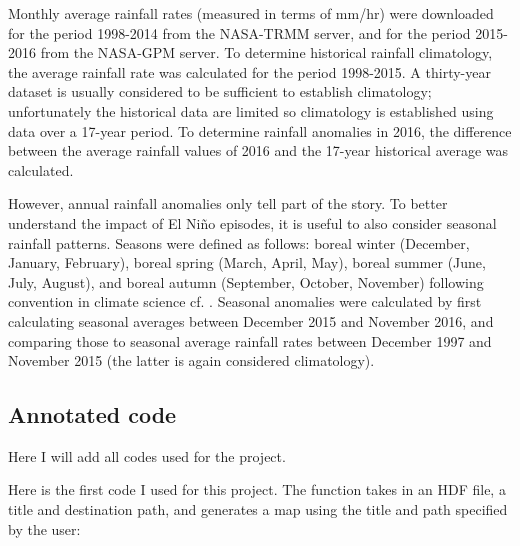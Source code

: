 \documentclass[12pt]{article}
\begin{document}
Monthly average rainfall rates (measured in terms of mm/hr) were downloaded for the period 1998-2014 from the NASA-TRMM server, and for the period 2015-2016 from the NASA-GPM server. To determine historical rainfall climatology, the average rainfall rate was calculated for the period 1998-2015. A thirty-year dataset is usually considered to be sufficient to establish climatology; unfortunately the historical data are limited so climatology is established using data over a 17-year period. To determine rainfall anomalies in 2016, the difference between the average rainfall values of 2016 and the 17-year historical average was calculated.

However, annual rainfall anomalies only tell part of the story. To better understand the impact of El Ni{\~n}o episodes, it is useful to also consider seasonal rainfall patterns. Seasons were defined as follows: boreal winter (December, January, February), boreal spring (March, April, May), boreal summer (June, July, August), and boreal autumn (September, October, November) following convention in climate science cf. \cite{larkin2005global}. Seasonal anomalies were calculated by first calculating seasonal averages between December 2015 and November 2016, and comparing those to seasonal average rainfall rates between December 1997 and November 2015 (the latter is again considered climatology).      
 
\subsection{Annotated code}
Here I will add all codes used for the project.

Here is the first code I used for this project. The function takes in an HDF file, a title and destination path, and generates a map using the title and path specified by the user:\\
\end{document}

